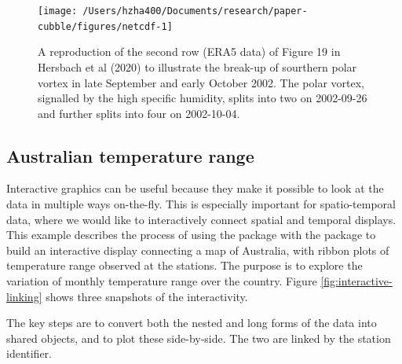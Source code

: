 \documentclass[
  shortnames]{jss}
\begin{document}
\begin{CodeChunk}
\begin{figure}

{\centering \texttt{[image: /Users/hzha400/Documents/research/paper-cubble/figures/netcdf-1]} 

}

\caption[A reproduction of the second row (ERA5 data) of Figure 19 in Hersbach et al (2020) to illustrate the break-up of sourthern polar vortex in late September and early October 2002]{A reproduction of the second row (ERA5 data) of Figure 19 in Hersbach et al (2020) to illustrate the break-up of sourthern polar vortex in late September and early October 2002. The polar vortex, signalled by the high specific humidity, splits into two on 2002-09-26 and further splits into four on 2002-10-04.}\label{fig:netcdf}
\end{figure}
\end{CodeChunk}

\hypertarget{australian-temperature-range}{%
\subsection{Australian temperature range}\label{australian-temperature-range}}

Interactive graphics can be useful because they make it possible to look at the data in multiple ways on-the-fly. This is especially important for spatio-temporal data, where we would like to interactively connect spatial and temporal displays. This example describes the process of using the  package with the  package to build an interactive display connecting a map of Australia, with ribbon plots of temperature range observed at the stations. The purpose is to explore the variation of monthly temperature range over the country. Figure \ref{fig:interactive-linking} shows three snapshots of the interactivity.

The key steps are to convert both the nested and long forms of the data into shared  objects, and to plot these side-by-side. The two are linked by the station identifier.
\end{document}
